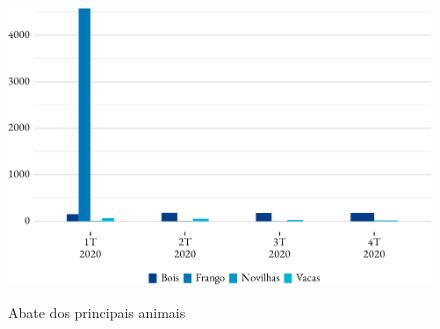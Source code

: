 \begin{figure}[!h]
	\caption{Abate dos principais animais}
	\includegraphics{fig/abates-1.pdf}
	\label{fig:abate}
	\notes{\trimestres}
\end{figure}